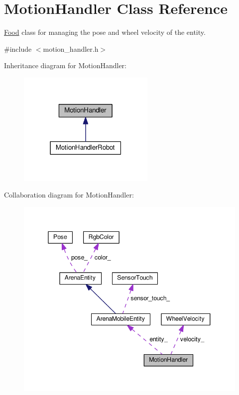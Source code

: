 \hypertarget{classMotionHandler}{}\section{Motion\+Handler Class Reference}
\label{classMotionHandler}


\hyperlink{classFood}{Food} class for managing the pose and wheel velocity of the entity.  




{\ttfamily \#include $<$motion\+\_\+handler.\+h$>$}



Inheritance diagram for Motion\+Handler\+:\nopagebreak
\begin{figure}[H]
\begin{center}
\leavevmode
\includegraphics[width=186pt]{classMotionHandler__inherit__graph}
\end{center}
\end{figure}


Collaboration diagram for Motion\+Handler\+:\nopagebreak
\begin{figure}[H]
\begin{center}
\leavevmode
\includegraphics[width=345pt]{classMotionHandler__coll__graph}
\end{center}
\end{figure}
